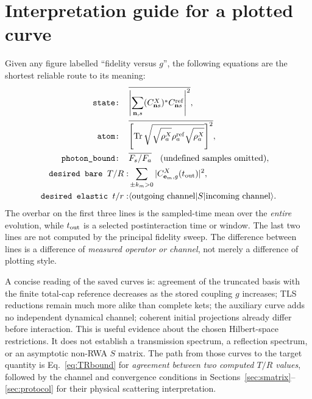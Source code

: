 \documentclass[11pt,a4paper]{article}
\newcommand{\ket}[1]{\lvert #1\rangle}
\newcommand{\bra}[1]{\langle #1\rvert}
\newcommand{\Tr}{\operatorname{Tr}}
\begin{document}
\section{Interpretation guide for a plotted curve}
\label{sec:guide}
Given any figure labelled ``fidelity versus $g$'', the following equations are the shortest reliable route to its meaning:
\begin{align*}
\texttt{state: }&\overline{\left|\sum_{\mathbf n,s}(C^X_{\mathbf n s})^*C^{\rm ref}_{\mathbf n s}\right|^2},\\
\texttt{atom: }&\overline{\left[\Tr\sqrt{\sqrt{\rho_a^X}\rho_a^{\rm ref}\sqrt{\rho_a^X}}\right]^2},\\
\texttt{photon\_bound: }&\overline{F_s/F_a}\quad(\text{undefined samples omitted}),\\
\texttt{desired bare }T/R:&\sum_{\pm k_m>0}|C^X_{\mathbf e_m,g}(t_{\rm out})|^2,\\
\texttt{desired elastic }t/r:&\bra{\text{outgoing channel}}S\ket{\text{incoming channel}}.
\end{align*}
The overbar on the first three lines is the sampled-time mean over the \emph{entire} evolution, while $t_{\rm out}$ is a selected postinteraction time or window. The last two lines are not computed by the principal fidelity sweep. The difference between lines is a difference of \emph{measured operator or channel}, not merely a difference of plotting style.

A concise reading of the saved curves is: agreement of the truncated basis with the finite total-cap reference decreases as the stored coupling $g$ increases; TLS reductions remain much more alike than complete kets; the auxiliary curve adds no independent dynamical channel; coherent initial projections already differ before interaction. This is useful evidence about the chosen Hilbert-space restrictions. It does not establish a transmission spectrum, a reflection spectrum, or an asymptotic non-RWA $S$ matrix. The path from those curves to the target quantity is Eq.~\eqref{eq:TRbound} for \emph{agreement between two computed $T/R$ values}, followed by the channel and convergence conditions in Sections~\ref{sec:smatrix}--\ref{sec:protocol} for their physical scattering interpretation.
\end{document}
